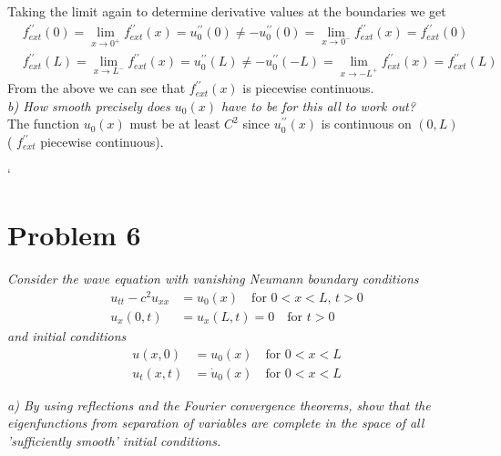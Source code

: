 \documentclass[12pt]{article}
\theoremstyle{remark}
\begin{document}
Taking the limit again to determine derivative values at the boundaries we get
\begin{align*}
	& f^{\prime\prime}_{ext}(0) = \lim_{x \rightarrow 0^+} f^{\prime\prime}_{ext}(x) = u^{\prime\prime}_0(0) \neq -u^{\prime\prime}_0(0) = \lim_{x \rightarrow 0^-} f_{ext}^{\prime\prime}(x) = f^{\prime\prime}_{ext}(0) \\
	& f^{\prime\prime}_{ext}(L) = \lim_{x \rightarrow L^-} f^{\prime\prime}_{ext}(x) = u^{\prime\prime}_0(L) \neq -u^{\prime\prime}_0(-L) = \lim_{x \rightarrow -L^+} f_{ext}^{\prime\prime}(x) = f^{\prime\prime}_{ext}(L)  
\end{align*}
From the above we can see that $f^{\prime\prime}_{ext}(x)$ is piecewise continuous. \\	

\textit{b) How smooth precisely does $u_0(x)$ have to be for this all to work out?} \\

The function $u_0(x)$ must be at least $C^2$ since $u_0^{\prime\prime}(x)$ is continuous on $(0,L)$ ( $f_{ext}^{\prime\prime}$ piecewise continuous).

\newpage
`
\section*{Problem 6}

\textit{Consider the wave equation with vanishing Neumann boundary conditions}
\begin{align}
	u_{tt} - c^2u_{xx} & = u_0(x) \quad \text{for } 0 < x < L, \, t > 0 \\
	u_x(0,t) & = u_x(L,t) = 0 \quad \text{for } t > 0
\end{align}
\textit{and initial conditions}
\begin{align}
	u(x,0) & = u_0(x) \quad \text{for } 0 < x < L \\
	u_t(x,t) & = \dot{u}_0(x) \quad \text{for } 0 < x < L
\end{align} 

\textit{a) By using reflections and the Fourier convergence theorems, show that the eigenfunctions from separation of variables are complete in the space of all 'sufficiently smooth' initial conditions.} \\
\end{document}
